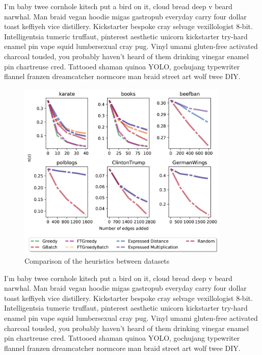I'm baby twee cornhole kitsch put a bird on it, cloud bread deep v beard narwhal. Man braid vegan hoodie migas gastropub everyday carry four dollar toast keffiyeh vice distillery. Kickstarter bespoke cray selvage vexillologist 8-bit. Intelligentsia tumeric truffaut, pinterest aesthetic unicorn kickstarter try-hard enamel pin vape squid lumbersexual cray pug. Vinyl umami gluten-free activated charcoal tousled, you probably haven't heard of them drinking vinegar enamel pin chartreuse cred. Tattooed shaman quinoa YOLO, gochujang typewriter flannel franzen dreamcatcher normcore man braid street art wolf twee DIY.

\clearpage

\begin{figure}[!htbp]
	\centering
	\captionsetup{justification=centering,margin=2cm}
	\includegraphics[width=0.90\textwidth]{Figures/heuristics_big}
	\caption{Comparison of the heuristics between datasets}
	\label{fig:heuristics_bigl}
\end{figure}

I'm baby twee cornhole kitsch put a bird on it, cloud bread deep v beard narwhal. Man braid vegan hoodie migas gastropub everyday carry four dollar toast keffiyeh vice distillery. Kickstarter bespoke cray selvage vexillologist 8-bit. Intelligentsia tumeric truffaut, pinterest aesthetic unicorn kickstarter try-hard enamel pin vape squid lumbersexual cray pug. Vinyl umami gluten-free activated charcoal tousled, you probably haven't heard of them drinking vinegar enamel pin chartreuse cred. Tattooed shaman quinoa YOLO, gochujang typewriter flannel franzen dreamcatcher normcore man braid street art wolf twee DIY.

